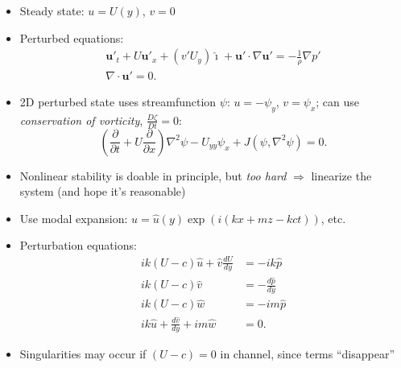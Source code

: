 \documentclass[landscape]{seminar}
\newcommand{\pdiff}[2]{\frac{\partial #1}{\partial #2}}
\newcommand{\jcbn}[2]{J\left(#1, #2 \right)}
\begin{document}
\begin{slide}

\begin{itemize}
  \item Steady state: $u = U(y)$, $v =0$

  \item Perturbed equations:
\begin{subequations}
\begin{gather}
\bm{u}'_t + U \bm{u}'_x + \left(v' U_y \right) \hat{\bm{\imath}} + \bm{u}' \cdot \nabla \bm{u}' = - \frac{1}{\rho} \nabla p' \\
\nabla \cdot \bm{u}' = 0.
\end{gather}
\end{subequations}

\item 2D perturbed state uses streamfunction $\psi$: $u = - \psi_y$, $v = \psi_x$; can use \emph{conservation of vorticity}, $\frac{D \zeta}{Dt} = 0$:
\begin{equation}
\left(\pdiff{}{t} + U \pdiff{}{x} \right) \nabla^2 \psi - U_{yy} \psi_x + \jcbn{\psi}{\nabla^2 \psi} = 0.
\end{equation}

\end{itemize}

\end{slide}
\begin{slide}

\begin{itemize}

  \item Nonlinear stability is doable in principle, but \emph{too hard} $\Rightarrow$ linearize the system (and hope it's reasonable)

  \item Use modal expansion: $u = \hat{u}(y)\exp(i(kx + mz - kct))$, etc.

  \item Perturbation equations:
\begin{subequations}
\begin{align}
i k \left(U - c\right)\hat{u} + \hat{v} \frac{dU}{dy} &= - i k \hat{p} \\
i k \left(U - c\right)\hat{v} &= - \frac{d \hat{p}}{d y} \\
i k \left(U - c\right)\hat{w} &= - i m \hat{p} \\
i k \hat{u} + \frac{d\hat{v}}{d y} + i m \hat{w} &= 0.
\end{align}
\end{subequations}

\item Singularities may occur if $(U - c) = 0$ in channel, since terms ``disappear''

\end{itemize}

\end{slide}
\end{document}
